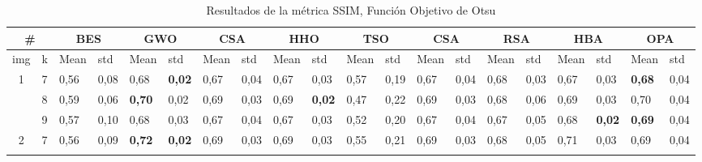 \documentclass[conference]{IEEEtran}
\begin{document}
\begin{table}[]
	\caption{Resultados de la métrica SSIM, Función Objetivo de Otsu}
	\begin{tabular}{|cl|ll|ll|ll|ll|ll|ll|ll|ll|ll|}
		\hline
		\multicolumn{2}{|c|}{\#} & \multicolumn{2}{c|}{BES} & \multicolumn{2}{c|}{GWO} & \multicolumn{2}{c|}{CSA} & \multicolumn{2}{c|}{HHO} & \multicolumn{2}{c|}{TSO} & \multicolumn{2}{c|}{CSA} & \multicolumn{2}{c|}{RSA} & \multicolumn{2}{c|}{HBA} & \multicolumn{2}{c|}{OPA} \\ \hline
		\multicolumn{1}{|l|}{img} & k & \multicolumn{1}{l|}{Mean} & std & \multicolumn{1}{l|}{Mean} & std & \multicolumn{1}{l|}{Mean} & std & \multicolumn{1}{l|}{Mean} & std & \multicolumn{1}{l|}{Mean} & std & \multicolumn{1}{l|}{Mean} & std & \multicolumn{1}{l|}{Mean} & std & \multicolumn{1}{l|}{Mean} & std & \multicolumn{1}{l|}{Mean} & std \\ \hline
		\multicolumn{1}{|c|}{\multirow{3}{*}{1}} & 7 & \multicolumn{1}{l|}{0,56} & 0,08 & \multicolumn{1}{l|}{0,68} & \textbf{0,02} & \multicolumn{1}{l|}{0,67} & 0,04 & \multicolumn{1}{l|}{0,67} & 0,03 & \multicolumn{1}{l|}{0,57} & 0,19 & \multicolumn{1}{l|}{0,67} & 0,04 & \multicolumn{1}{l|}{0,68} & 0,03 & \multicolumn{1}{l|}{0,67} & 0,03 & \multicolumn{1}{l|}{\textbf{0,68}} & 0,04 \\ \cline{2-20} 
		\multicolumn{1}{|c|}{} & 8 & \multicolumn{1}{l|}{0,59} & 0,06 & \multicolumn{1}{l|}{\textbf{0,70}} & 0,02 & \multicolumn{1}{l|}{0,69} & 0,03 & \multicolumn{1}{l|}{0,69} & \textbf{0,02} & \multicolumn{1}{l|}{0,47} & 0,22 & \multicolumn{1}{l|}{0,69} & 0,03 & \multicolumn{1}{l|}{0,68} & 0,06 & \multicolumn{1}{l|}{0,69} & 0,03 & \multicolumn{1}{l|}{0,70} & 0,04 \\ \cline{2-20} 
		\multicolumn{1}{|c|}{} & 9 & \multicolumn{1}{l|}{0,57} & 0,10 & \multicolumn{1}{l|}{0,68} & 0,03 & \multicolumn{1}{l|}{0,67} & 0,04 & \multicolumn{1}{l|}{0,67} & 0,03 & \multicolumn{1}{l|}{0,52} & 0,20 & \multicolumn{1}{l|}{0,67} & 0,04 & \multicolumn{1}{l|}{0,67} & 0,05 & \multicolumn{1}{l|}{0,68} & \textbf{0,02} & \multicolumn{1}{l|}{\textbf{0,69}} & 0,04 \\ \hline
		\multicolumn{1}{|c|}{\multirow{3}{*}{2}} & 7 & \multicolumn{1}{l|}{0,56} & 0,09 & \multicolumn{1}{l|}{\textbf{0,72}} & \textbf{0,02} & \multicolumn{1}{l|}{0,69} & 0,03 & \multicolumn{1}{l|}{0,69} & 0,03 & \multicolumn{1}{l|}{0,55} & 0,21 & \multicolumn{1}{l|}{0,69} & 0,03 & \multicolumn{1}{l|}{0,68} & 0,05 & \multicolumn{1}{l|}{0,71} & 0,03 & \multicolumn{1}{l|}{0,69} & 0,04 \\ \cline{2-20} 

\end{tabular}
\end{table}
\end{document}

